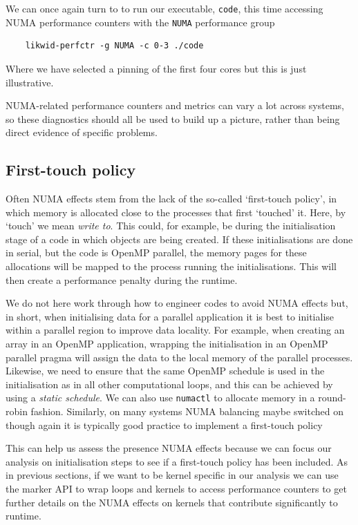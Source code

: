 \begin{instructions}{\likwid}
  We can once again turn to \likwid to run our executable, \texttt{code}, this time accessing NUMA performance counters with the \texttt{NUMA} performance group 
  \begin{verbatim}
    likwid-perfctr -g NUMA -c 0-3 ./code
  \end{verbatim}
  Where we have selected a pinning of the first four cores but this is just illustrative.
\end{instructions}

NUMA-related performance counters and metrics can vary a lot across systems, so
these diagnostics should all be used to build up a picture, rather than being
direct evidence of specific problems.

\subsection{First-touch policy}

Often NUMA effects stem from the lack of the so-called `first-touch policy', in
which memory is allocated close to the processes that first `touched' it. Here,
by `touch' we mean \emph{write to}. This could, for example, be during the
initialisation stage of a code in which objects are being created. If these
initialisations are done in serial, but the code is OpenMP parallel, the memory
pages for these allocations will be mapped to the process running the
initialisations. This will then create a performance penalty during the runtime.

We do not here work through how to engineer codes to avoid NUMA effects but, in
short, when initialising data for a parallel application it is best to
initialise within a parallel region to improve data locality. For example, when
creating an array in an OpenMP application, wrapping the initialisation in an
OpenMP parallel pragma will assign the data to the local memory of the parallel
processes. Likewise, we need to ensure that the same OpenMP schedule is used in
the initialisation as in all other computational loops, and this can be
achieved by using a \emph{static schedule}. We can also use \texttt{numactl} to
allocate memory in a round-robin fashion. Similarly, on many systems NUMA
balancing maybe switched on though again it is typically good practice to
implement a first-touch policy

This can help us assess the presence NUMA effects because we can focus our
analysis on initialisation steps to see if a first-touch policy has been
included. As in previous sections, if we want to be kernel specific in our
analysis we can use the \likwid marker API to wrap loops and kernels to access
performance counters to get further details on the NUMA effects on kernels that
contribute significantly to runtime.
